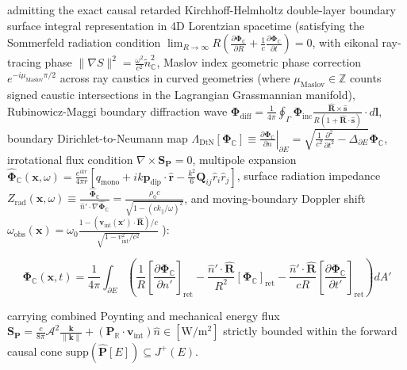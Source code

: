 \documentclass[11pt,a4paper]{article}
\theoremstyle{definition}\newtheorem{definition}{Definition}
\theoremstyle{remark}\newtheorem{remark}{Remark}
\begin{document}
admitting the exact causal retarded Kirchhoff-Helmholtz double-layer boundary surface integral representation in 4D Lorentzian spacetime (satisfying the Sommerfeld radiation condition $\lim_{R \to \infty} R \left( \frac{\partial \mathbf{\Phi}_{\mathbb{C}}}{\partial R} + \frac{1}{c} \frac{\partial \mathbf{\Phi}_{\mathbb{C}}}{\partial t} \right) = 0$, with eikonal ray-tracing phase $\|\nabla S\|^2 = \frac{\omega^2}{c^2}\tilde{n}_{\mathbb{C}}^2$, Maslov index geometric phase correction $e^{-i \mu_{\text{Maslov}}\pi/2}$ across ray caustics in curved geometries (where $\mu_{\text{Maslov}} \in \mathbb{Z}$ counts signed caustic intersections in the Lagrangian Grassmannian manifold), Rubinowicz-Maggi boundary diffraction wave $\mathbf{\Phi}_{\text{diff}} = \frac{1}{4\pi}\oint_{\Gamma} \mathbf{\Phi}_{\text{inc}}\frac{\hat{\mathbf{R}}\times\hat{\mathbf{s}}}{R(1+\hat{\mathbf{R}}\cdot\hat{\mathbf{s}})}\cdot d\mathbf{l}$, boundary Dirichlet-to-Neumann map $\Lambda_{\text{DtN}}[\mathbf{\Phi}_{\mathbb{C}}] \equiv \left. \frac{\partial\mathbf{\Phi}_{\mathbb{C}}}{\partial n} \right|_{\partial E} = \sqrt{\frac{1}{c^2}\frac{\partial^2}{\partial t^2} - \Delta_{\partial E}}\mathbf{\Phi}_{\mathbb{C}}$, irrotational flux condition $\nabla \times \mathbf{S}_{\mathbf{P}} = 0$, multipole expansion $\hat{\mathbf{\Phi}}_{\mathbb{C}}(\mathbf{x}, \omega) = \frac{e^{ikr}}{4\pi r}[q_{\text{mono}} + ik\mathbf{p}_{\text{dip}}\cdot\hat{\mathbf{r}} - \frac{k^2}{6}\mathbf{Q}_{ij}\hat{r}_i\hat{r}_j]$, surface radiation impedance $Z_{\text{rad}}(\mathbf{x}, \omega) \equiv \frac{\hat{\mathbf{\Phi}}_{\mathbb{C}}}{\hat{n}'\cdot\nabla\hat{\mathbf{\Phi}}_{\mathbb{C}}} = \frac{\rho_0 c}{\sqrt{1 - (c k_\parallel/\omega)^2}}$, and moving-boundary Doppler shift $\omega_{\text{obs}}(\mathbf{x}) = \omega_0 \frac{1 - (\mathbf{v}_{\text{int}}(\mathbf{x}')\cdot\hat{\mathbf{R}})/c}{\sqrt{1 - v_{\text{int}}^2/c^2}}$ ):


\begin{equation}
\mathbf{\Phi}_{\mathbb{C}}(\mathbf{x}, t) = \frac{1}{4\pi}\int_{\partial E} \left( \frac{1}{R}[ \frac{\partial\mathbf{\Phi}_{\mathbb{C}}}{\partial n'} ]_{\text{ret}} - \frac{\hat{n}' \cdot \hat{\mathbf{R}}}{R^2}[\mathbf{\Phi}_{\mathbb{C}}]_{\text{ret}} - \frac{\hat{n}' \cdot \hat{\mathbf{R}}}{c R}[\frac{\partial\mathbf{\Phi}_{\mathbb{C}}}{\partial t'}]_{\text{ret}} \right) dA'
\end{equation}


carrying combined Poynting and mechanical energy flux $\mathbf{S}_{\mathbf{P}} = \frac{c}{8\pi} \mathcal{A}^2 \frac{\mathbf{k}}{\|\mathbf{k}\|} + (\mathbf{P}_{\mathbb{R}} \cdot \mathbf{v}_{\text{int}})\hat{n} \in [\mathrm{W/m^2}]$ strictly bounded within the forward causal cone $\mathrm{supp}(\hat{\mathbf{P}}[E]) \subseteq J^+(E)$.
\end{document}
